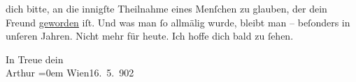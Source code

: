                dich bitte, an die innigſte {\pb}Theilnahme eines
               Menſchen zu glauben, der dein Freund \uline{geworden} iſt.
               Und was man{ }ſo allmälig wurde, bleibt man – beſonders in unſeren Jahren. Nicht mehr
               für heute. Ich hoffe dich bald zu{ }ſehen.\pend
           
\pstart
           In Treue dein{\\[\baselineskip]}\spacefill\mbox{Arthur}\pend
           \leftskip=0em{}
\pstart
           Wien16. 5. 902\pend
           \endnumbering{}  \newcommand{\dateiname}{L01220}\newcommand{\titel}{Arthur Schnitzler an Hermann Bahr, 16. 5. 1902}\newcommand{\editorInnen}{Herausgegeben von Martin Anton Müller}
